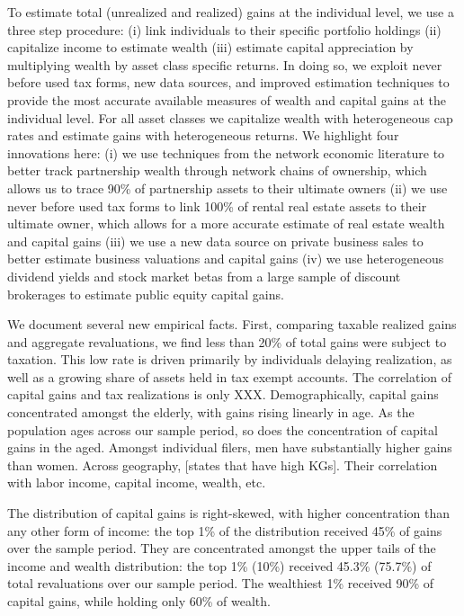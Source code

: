 \documentclass[12pt]{article}
\begin{document}
To estimate total (unrealized and realized) gains at the individual level, we use a three step procedure: (i) link individuals to their specific portfolio holdings (ii) capitalize income to estimate wealth (iii) estimate capital appreciation by multiplying wealth by asset class specific returns. In doing so, we exploit never before used tax forms, new data sources, and improved estimation techniques to provide the most accurate available measures of wealth and capital gains at the individual level. For all asset classes we capitalize wealth with heterogeneous cap rates and estimate gains with heterogeneous returns. We highlight four innovations here: (i) we use techniques from the network economic literature to better track partnership wealth through network chains of ownership, which allows us to trace 90\% of partnership assets to their ultimate owners (ii) we use never before used tax forms to link 100\% of rental real estate assets to their ultimate owner, which allows for a more accurate estimate of real estate wealth and capital gains (iii) we use a new data source on private business sales to better estimate business valuations and capital gains (iv) we use heterogeneous dividend yields and stock market betas from a large sample of discount brokerages to estimate public equity capital gains. 

We document several new empirical facts. First, comparing taxable realized gains and aggregate revaluations, we find less than 20\% of total gains were subject to taxation. This low rate is driven primarily by individuals delaying realization, as well as a growing share of assets held in tax exempt accounts. The correlation of capital gains and tax realizations is only XXX. Demographically, capital gains concentrated amongst the elderly, with gains rising linearly in age. As the population ages across our sample period, so does the concentration of capital gains in the aged. Amongst individual filers, men have substantially higher gains than women. Across geography, [states that have high KGs]. Their correlation with labor income, capital income, wealth, etc. 

The distribution of capital gains is right-skewed, with higher concentration than any other form of income: the top 1\% of the distribution received 45\% of gains over the sample period. They are concentrated amongst the upper tails of the income and wealth distribution: the top 1\% (10\%) received 45.3\% (75.7\%) of total revaluations over our sample period. The wealthiest 1\% received 90\% of capital gains, while holding only 60\% of wealth. 
\end{document}
